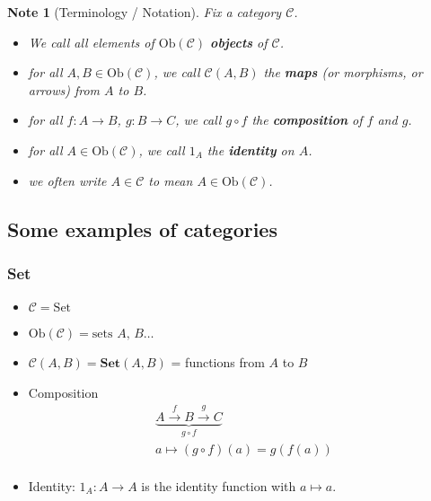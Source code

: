 \documentclass{article}
\newtheorem{note}{Note}
\begin{document}
    \begin{note}[Terminology / Notation]
        Fix a category $\mathcal{C}$.
        \begin{itemize}
            \item We call all elements of $\text{Ob}(\mathcal{C})$ \textbf{objects} of $\mathcal{C}$.
            \item for all $A, B \in \text{Ob}(\mathcal{C})$, we call $\mathcal{C}(A, B)$ the \textbf{maps} (or morphisms, or arrows) from $A$ to $B$.
            \item for all $f: A \to B$, $g: B \to C$, we call $g \circ f$ the \textbf{composition} of $f$ and $g$.
            \item for all $A \in \text{Ob}(\mathcal{C})$, we call $1_A$ the \textbf{identity} on $A$.
            \item we often write $A \in \mathcal{C}$ to mean $A \in \text{Ob}(\mathcal{C})$.
        \end{itemize}
    \end{note}

    \subsection{Some examples of categories}

    \subsubsection{Set}
    \begin{itemize}
        \item $\mathcal{C} = \text{Set}$
        \item $\text{Ob}(\mathcal{C}) = \text{sets $A$, $B$} \dots$
        \item $\mathcal{C}(A, B) = \textbf{Set}(A, B)$ = functions from $A$ to $B$
        \item Composition
        \begin{gather*}
            \underbrace{A \stackrel{f}{\to} B \stackrel{g}{\to} C}_{g \circ f}\\
            a \mapsto (g \circ f)(a) = g(f(a))\\
        \end{gather*}
        \item Identity: $1_A: A \to A$ is the identity function with $a \mapsto a$.
    \end{itemize}
\end{document}
